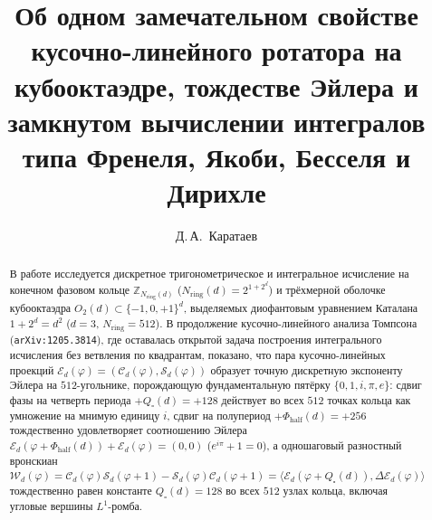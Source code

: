 \documentclass[11pt,a4paper]{article}
\title{\textbf{Об одном замечательном свойстве кусочно-линейного ротатора на кубооктаэдре, тождестве Эйлера и замкнутом вычислении интегралов типа Френеля, Якоби, Бесселя и Дирихле}}
\author{Д.\,А.~Каратаев}
\date{}
\theoremstyle{plain}
\theoremstyle{definition}
\begin{document}
\maketitle

\begin{abstract}
В работе исследуется дискретное тригонометрическое и интегральное исчисление на конечном фазовом кольце $\mathbb{Z}_{N_{\mathrm{ring}}(d)}$ ($N_{\mathrm{ring}}(d) = 2^{1+2^d}$) и трёхмерной оболочке кубооктаэдра $O_2(d)\subset\{-1,0,+1\}^d$, выделяемых диофантовым уравнением Каталана $1+2^d=d^2$ ($d=3$, $N_{\mathrm{ring}}=512$). В продолжение кусочно-линейного анализа Томпсона (\texttt{arXiv:1205.3814}), где оставалась открытой задача построения интегрального исчисления без ветвления по квадрантам, показано, что пара кусочно-линейных проекций $\mathcal{E}_d(\varphi) = (\mathcal{C}_d(\varphi),\mathcal{S}_d(\varphi))$ образует точную дискретную экспоненту Эйлера на $512$-угольнике, порождающую фундаментальную пятёрку $\{0,1,i,\pi,e\}$: сдвиг фазы на четверть периода $+Q_\square(d)=+128$ действует во всех $512$ точках кольца как умножение на мнимую единицу $i$, сдвиг на полупериод $+\Phi_{\mathrm{half}}(d)=+256$ тождественно удовлетворяет соотношению Эйлера $\mathcal{E}_d(\varphi+\Phi_{\mathrm{half}}(d))+\mathcal{E}_d(\varphi)=(0,0)$ ($e^{i\pi}+1=0$), а одношаговый разностный вронскиан $\mathcal{W}_d(\varphi)=\mathcal{C}_d(\varphi)\mathcal{S}_d(\varphi+1)-\mathcal{S}_d(\varphi)\mathcal{C}_d(\varphi+1)=\langle \mathcal{E}_d(\varphi+Q_\square(d)),\Delta\mathcal{E}_d(\varphi)\rangle$ тождественно равен константе $Q_\square(d)=128$ во всех $512$ узлах кольца, включая угловые вершины $L^1$-ромба.


\end{abstract}
\end{document}
